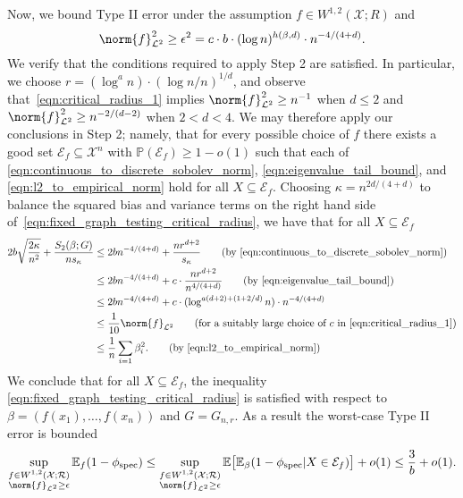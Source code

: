 \documentclass{article}
\newcommand{\1}{\mathbf{1}}
\newcommand{\Xset}{\mathcal{X}}
\newcommand{\Leb}{\mathcal{L}}
\newcommand{\Pbb}{\mathbb{P}}
\newcommand{\spec}{\mathrm{spec}}
\theoremstyle{alden}
\theoremstyle{aldenthm}
\theoremstyle{definition}
\theoremstyle{remark}
\begin{document}
Now, we bound Type II error under the assumption $f \in W^{1,2}(\mathcal{X};R)$ and 
\begin{equation}
\label{eqn:critical_radius_1}
\norm{f}_{\Leb^2}^2 \geq \epsilon^2 = c \cdot b \cdot (\log n)^{h(\beta,d)} \cdot n^{-4/(4 + d)}.
\end{equation}
We verify that the conditions required to apply Step 2 are satisfied. In particular, we choose $r = (\log^a n) \cdot (\log n/n)^{1/d}$, and observe that~\eqref{eqn:critical_radius_1} implies $\norm{f}_{\Leb^2}^2 \geq n^{-1}$ when $d \leq 2$ and $\norm{f}_{\Leb^2}^2 \geq n^{-2/(d - 2)}$ when $2 < d < 4$. We may therefore apply our conclusions in Step 2; namely, that for every possible choice of $f$ there exists a good set $\mathcal{E}_f \subseteq \Xset^n$ with $\Pbb(\mathcal{E}_f) \geq 1 - o(1)$ such that each of \eqref{eqn:continuous_to_discrete_sobolev_norm}, \eqref{eqn:eigenvalue_tail_bound}, and \eqref{eqn:l2_to_empirical_norm} hold for all $X \subseteq \mathcal{E}_f$. Choosing $\kappa = n^{2d/(4 + d)}$ to balance the squared bias and variance terms on the right hand side of~\eqref{eqn:fixed_graph_testing_critical_radius}, we have that for all $X \subseteq \mathcal{E}_f$
\begin{align*}
2b\sqrt{\frac{2\kappa}{n^2}} + \frac{S_2(\beta;G)}{ns_{\kappa}} & \leq 2bn^{-4/(4+d)} + \frac{n r^{d + 2}}{s_{\kappa}} \tag{by \eqref{eqn:continuous_to_discrete_sobolev_norm}} \\
& \leq 2bn^{-4/(4+d)} + c\cdot\frac{n r^{d + 2}}{n^{4/(4+d)}} \tag{by \eqref{eqn:eigenvalue_tail_bound}} \\
& \leq 2bn^{-4/(4+d)} + c\cdot(\log^{a(d + 2) + (1 + 2/d)}n)\cdot n^{-4/(4+d)} \\
& \leq \frac{1}{10}\norm{f}_{\Leb^2} \tag{for a suitably large choice of $c$ in \eqref{eqn:critical_radius_1}}\\
& \leq \frac{1}{n}\sum_{i = 1} \beta_i^2. \tag{by \eqref{eqn:l2_to_empirical_norm}}
\end{align*}
We conclude that for all $X \subseteq \mathcal{E}_f$, the inequality \eqref{eqn:fixed_graph_testing_critical_radius} is satisfied with respect to $\beta = (f(x_1),\ldots,f(x_n))$ and $G = G_{n,r}$. As a result the worst-case Type II error is bounded
\begin{equation*}
\sup_{\substack{f \in W^{1,2}(\mathcal{X;R}) \\ \norm{f}_{\Leb^2} \geq \epsilon}}\mathbb{E}_{f}(1 - \phi_{\spec}) \leq \sup_{\substack{f \in W^{1,2}(\mathcal{X;R}) \\ \norm{f}_{\Leb^2} \geq \epsilon}} \mathbb{E}\bigl[\mathbb{E}_{\beta}(1 - \phi_{\spec}|X \in \mathcal{E}_f)\bigr] + o(1) \leq \frac{3}{b} + o(1).
\end{equation*}
\end{document}
